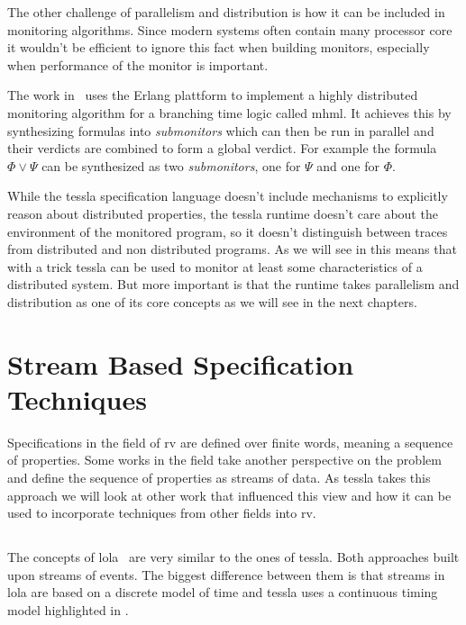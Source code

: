 The other challenge of parallelism and distribution is how it can be included in monitoring algorithms.
Since modern systems often contain many processor core it wouldn't be efficient to ignore this fact when building monitors, especially when performance of the monitor is important.

The work in~\cite{Attard2016} uses the Erlang plattform to implement a highly distributed monitoring algorithm for a branching time logic called \gls{mhml}.
It achieves this by synthesizing formulas into \emph{submonitors} which can then be run in parallel and their verdicts are combined to form a global verdict.
For example the formula \(\Phi \vee \Psi\) can be synthesized as two \emph{submonitors}, one for \(\Psi\) and one for \(\Phi\).

While the \gls{tessla} specification language doesn't include mechanisms to explicitly reason about distributed properties, the \gls{tessla} runtime doesn't care about the environment of the monitored program, so it doesn't distinguish between traces from distributed and non distributed programs.
As we will see in  this means that with a trick \gls{tessla} can be used to monitor at least some characteristics of a distributed system.
But more important is that the runtime takes parallelism and distribution as one of its core concepts as we will see in the next chapters.


\section{Stream Based Specification Techniques}
\label{sec:related:stream_based}

Specifications in the field of \gls{rv} are defined over finite words, meaning a sequence of properties.
Some works in the field take another perspective on the problem and define the sequence of properties as streams of data.
As \gls{tessla} takes this approach we will look at other work that influenced this view and how it can be used to incorporate techniques from other fields into \gls{rv}.

\subsection{}
\label{sec:related:stream_based:lola}

The concepts of \gls{lola}~\cite{DAngelo2005} are very similar to the ones of \gls{tessla}.
Both approaches built upon streams of events.
The biggest difference between them is that streams in \gls{lola} are based on a discrete model of time and \gls{tessla} uses a continuous timing model highlighted in .

